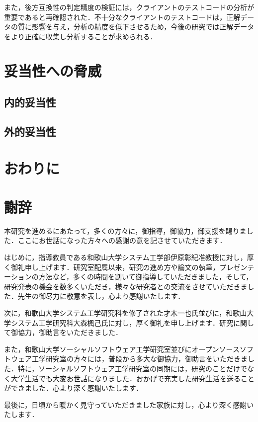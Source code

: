 \documentclass[11pt,dvipdfmx]{jreport}
\begin{document}
また，後方互換性の判定精度の検証には，クライアントのテストコードの分析が重要であると再確認された．不十分なクライアントのテストコードは，正解データの質に影響を与え，分析の精度を低下させるため，今後の研究では正解データをより正確に収集し分析することが求められる．


\chapter{妥当性への脅威}\label{chap:heuristic}

\section{内的妥当性}

\section{外的妥当性}

\chapter{おわりに}\label{chap:end}

\chapter*{謝辞}

本研究を進めるにあたって，多くの方々に，御指導，御協力，御支援を賜りました．ここにお世話になった方々への感謝の意を記させていただきます．

はじめに，指導教員である和歌山大学システム工学部伊原彰紀准教授に対し，厚く御礼申し上げます．研究室配属以来，研究の進め方や論文の執筆，プレゼンテーションの方法など，多くの時間を割いて御指導していただきました，そして，研究発表の機会を数多くいただき，様々な研究者との交流をさせていただきました．先生の御尽力に敬意を表し，心より感謝いたします．

次に，和歌山大学システム工学研究科を修了された才木一也氏並びに，和歌山大学システム工学研究科大森楓己氏に対し，厚く御礼を申し上げます．研究に関して御協力，御助言をいただきました．

また，和歌山大学ソーシャルソフトウェア工学研究室並びにオープンソースソフトウェア工学研究室の方々には，普段から多大な御協力，御助言をいただきました．特に，ソーシャルソフトウェア工学研究室の同期には，研究のことだけでなく大学生活でも大変お世話になりました．おかげで充実した研究生活を送ることができました．心より深く感謝いたします．

最後に，日頃から暖かく見守っていただきました家族に対し，心より深く感謝いたします．
\end{document}
